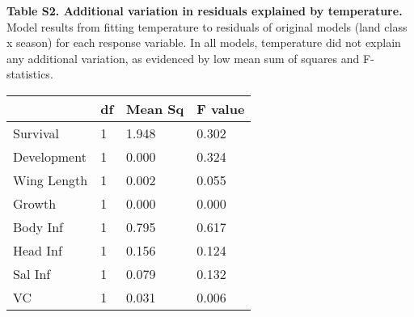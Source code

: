 \documentclass[12pt]{article}
\begin{document}
\begin{table}[h]
\textbf{Table S2. Additional variation in residuals explained by temperature.} Model results from fitting temperature to residuals of original models (land class x season) for each response variable. In all models, temperature did not explain any additional variation, as evidenced by low mean sum of squares and F-statistics.

\centering
\begin{tabular}{llll}
\hline
            & \textbf{df} & \textbf{Mean Sq} & \textbf{F value} \\
\hline
Survival    & 1           & 1.948            & 0.302            \\
Development & 1           & 0.000            & 0.324            \\
Wing Length & 1           & 0.002            & 0.055            \\
Growth      & 1           & 0.000            & 0.000            \\
Body Inf    & 1           & 0.795            & 0.617            \\
Head Inf    & 1           & 0.156            & 0.124            \\
Sal Inf     & 1           & 0.079            & 0.132            \\
VC          & 1           & 0.031            & 0.006						\\
\hline
\end{tabular}
\end{table}
\end{document}
